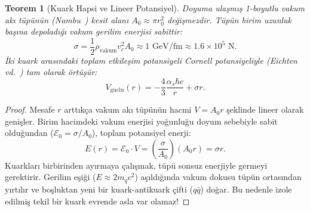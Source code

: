 \documentclass[11pt,a4paper]{article}
\newtheorem{theorem}{Teorem}[section]
\begin{document}
\begin{theorem}[Kuark Hapsi ve Lineer Potansiyel]
    \label{thm:kuark_hapsi_p3}
    Doyuma ulaşmış 1-boyutlu vakum akı tüpünün (Nambu~\cite{nambu1974}) kesit alanı $A_0 \approx \pi r_0^2$ değişmezdir. Tüpün birim uzunluk başına depoladığı vakum gerilim enerjisi sabittir:
    \begin{equation}
        \sigma = \frac{1}{2} \rho_{\mathrm{vakum}} v_c^2 A_0 \approx 1\text{ GeV/fm} \approx 1.6 \times 10^5\text{ N}.
        \label{eq:sicim_gerilimi_tr}
    \end{equation}
    İki kuark arasındaki toplam etkileşim potansiyeli Cornell potansiyeliyle (Eichten vd.~\cite{eichten1978}) tam olarak örtüşür:
    \begin{equation}
        V_{\mathrm{guclu}}(r) = -\frac{4}{3}\frac{\alpha_s \hbar c}{r} + \sigma r.
        \label{eq:cornell_ispat}
    \end{equation}
\end{theorem}

\begin{proof}
    Mesafe $r$ arttıkça vakum akı tüpünün hacmi $V = A_0 r$ şeklinde lineer olarak genişler. Birim hacimdeki vakum enerjisi yoğunluğu doyum sebebiyle sabit olduğundan ($\mathcal{E}_0 = \sigma / A_0$), toplam potansiyel enerji:
    \begin{equation}
        E(r) = \mathcal{E}_0 \cdot V = \left(\frac{\sigma}{A_0}\right) (A_0 r) = \sigma r.
    \end{equation}
    Kuarkları birbirinden ayırmaya çalışmak, tüpü sonsuz enerjiyle germeyi gerektirir. Gerilim eşiği ($E \approx 2 m_q c^2$) aşıldığında vakum dokusu tüpün ortasından yırtılır ve boşluktan yeni bir kuark-antikuark çifti ($q\bar{q}$) doğar. Bu nedenle izole edilmiş tekil bir kuark evrende asla var olamaz!
\end{proof}
\end{document}
